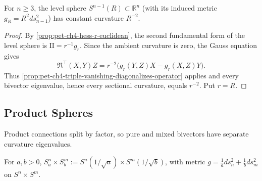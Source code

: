 \begin{proposition}
  \label{prop:pet-ch4-euclidean-sphere-constant-curvature}
  For $n\ge3$, the level sphere $S^{n-1}(R)\subset\mathbb{R}^n$ (with its induced metric
  $g_R=R^2ds_{n-1}^2$) has constant curvature $R^{-2}$.
\end{proposition}
\begin{proof}
  \sketch
  By \cref{prop:pet-ch4-hess-r-euclidean}, the second fundamental form of the
  level sphere is $\mathrm{II}=r^{-1}g_r$. Since the ambient curvature is zero,
  the Gauss equation gives
  \[
    \mathfrak R^\top(X,Y)Z
    =r^{-2}\bigl(g_r(Y,Z)X-g_r(X,Z)Y\bigr).
  \]
  Thus \cref{prop:pet-ch4-triple-vanishing-diagonalizes-operator} applies and
  every bivector eigenvalue, hence every sectional curvature, equals $r^{-2}$.
  Put $r=R$.
\end{proof}

\subsection{Product Spheres}

Product connections split by factor, so pure and mixed bivectors have separate
curvature eigenvalues.

\begin{definition}
  \label{def:pet-ch4-product-sphere-metric}
  \leanok
  For $a,b>0$, $S^n_a\times S^m_b:=S^n(1/\sqrt a)\times S^m(1/\sqrt b)$, with metric
  $g=\tfrac1a ds_n^2+\tfrac1b ds_m^2$ on $S^n\times S^m$.
\end{definition}

